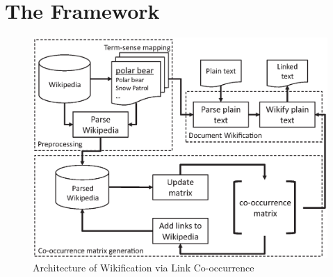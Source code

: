 \vfill\eject
\section{The Framework}
\label{sec:framework}
\begin{figure}[!h]
\begin{center}
\includegraphics[width=\columnwidth]{flowchat.eps}
\caption{Architecture of Wikification via Link Co-occurrence}
\label{fig:arch}
\end{center}
\end{figure}

